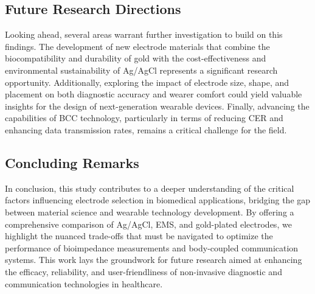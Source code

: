 \documentclass[conference]{IEEEtran}
\begin{document}
\subsection{Future Research Directions}

Looking ahead, several areas warrant further investigation to build on this findings. The development of new electrode materials that combine the biocompatibility and durability of gold with the cost-effectiveness and environmental sustainability of Ag/AgCl represents a significant research opportunity. Additionally, exploring the impact of electrode size, shape, and placement on both diagnostic accuracy and wearer comfort could yield valuable insights for the design of next-generation wearable devices. Finally, advancing the capabilities of BCC technology, particularly in terms of reducing CER and enhancing data transmission rates, remains a critical challenge for the field.

\subsection{Concluding Remarks}

In conclusion, this study contributes to a deeper understanding of the critical factors influencing electrode selection in biomedical applications, bridging the gap between material science and wearable technology development. By offering a comprehensive comparison of Ag/AgCl, EMS, and gold-plated electrodes, we highlight the nuanced trade-offs that must be navigated to optimize the performance of bioimpedance measurements and body-coupled communication systems. This work lays the groundwork for future research aimed at enhancing the efficacy, reliability, and user-friendliness of non-invasive diagnostic and communication technologies in healthcare.
\end{document}
